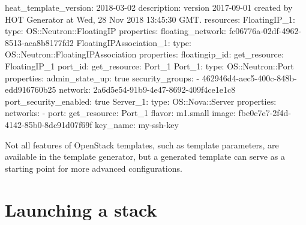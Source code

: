 \begin{code}{}
heat_template_version: 2018-03-02
description: version 2017-09-01 created by HOT Generator at Wed, 28 Nov 2018 13:45:30 GMT.
resources:
  FloatingIP_1:
    type: OS::Neutron::FloatingIP
    properties:
      floating_network: fc06776a-02df-4962-8513-aea8b8177fd2
  FloatingIPAssociation_1:
    type: OS::Neutron::FloatingIPAssociation
    properties:
      floatingip_id: { get_resource: FloatingIP_1 }
      port_id: { get_resource: Port_1 }
  Port_1:
    type: OS::Neutron::Port
    properties:
      admin_state_up: true
      security_groups:
        - 462946d4-aec5-400c-848b-edd916760b25
      network: 2a6d5e54-91b9-4e47-8692-409f4ce1e1c8
      port_security_enabled: true
  Server_1:
    type: OS::Nova::Server
    properties:
      networks:
        - port: { get_resource: Port_1 }
      flavor: m1.small
      image: fbe0c7e7-2f4d-4142-85b0-8dc91d07f69f
      key_name: my-ssh-key
\end{code}

Not all features of OpenStack templates, such as template parameters,
are available in the template generator, but a generated template can
serve as a starting point for more advanced configurations.

\section{Launching a stack}


